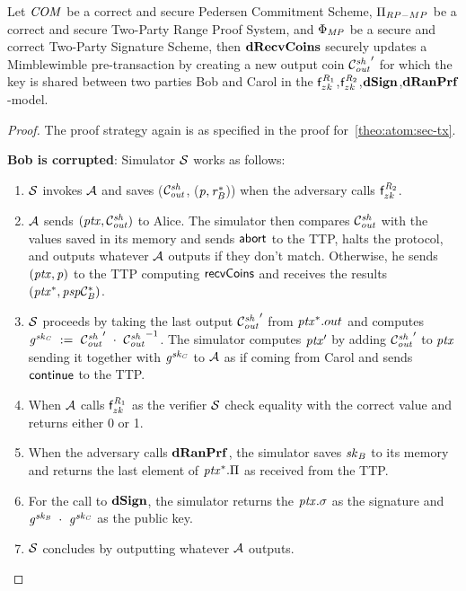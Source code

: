 \begin{theorem}
    \label{teo:atom:sec-drecv}
    Let $\mathit{COM}$ be a correct and secure Pedersen Commitment Scheme, $\Pi_{RP-MP}$ be a correct and secure Two-Party Range Proof System, and $\Phi_{\mathit{MP}}$ be a secure and correct Two-Party Signature Scheme, then $\mathbf{dRecvCoins}$ securely updates a Mimblewimble pre-transaction by creating a new output coin ${\mathcal{C}_{\mathit{out}}^{\mathit{sh}}}'$ for which the key is shared between two parties Bob and Carol in the $\mathsf{f}^{\mathit{R}_1}_{zk}$,$\mathsf{f}^{\mathit{R}_2}_{zk}$,$\mathbf{dSign}$,$\mathbf{dRanPrf}$-model.
\end{theorem}

\begin{proof}
    The proof strategy again is as specified in the proof for~\cref{theo:atom:sec-tx}.

    \textbf{Bob is corrupted}: Simulator $\mathcal{S}$ works as follows:
    \begin{enumerate}
        \item $\mathcal{S}$ invokes $\mathcal{A}$ and saves ($\mathcal{C}_{\mathit{out}}^{\mathit{sh}}$, ($\mathit{p}, \mathit{r}_{\mathit{B}}^*$)) when the adversary calls $\mathsf{f}^{\mathit{R}_2}_{zk}$.
        \item $\mathcal{A}$ sends $(\mathit{ptx},\mathcal{C}_{\mathit{out}}^{\mathit{sh}})$ to Alice.
        The simulator then compares $\mathcal{C}_{\mathit{out}}^{\mathit{sh}}$ with the values saved in its memory and sends $\mathsf{abort}$ to the TTP, halts the protocol, and outputs whatever $\mathcal{A}$ outputs if they don't match.
        Otherwise, he sends $(\mathit{ptx}, \mathit{p})$ to the TTP computing $\mathsf{recvCoins}$ and receives the results $(\mathit{ptx}^*, \mathit{psp}\mathcal{C}_{\mathit{B}}^*)$.
        \item $\mathcal{S}$ proceeds by taking the last output ${\mathcal{C}_{\mathit{out}}^{\mathit{sh}}}'$ from $\mathit{ptx}^*.out$ and computes $\mathit{g}^{\mathit{sk}_{\mathit{C}}} ~:=~ {\mathcal{C}_{\mathit{out}}^{\mathit{sh}}}' ~\cdot~ {\mathcal{C}_{\mathit{out}}^{\mathit{sh}}}^{-1}$.
        The simulator computes ${\mathit{ptx}}'$ by adding ${\mathcal{C}_{\mathit{out}}^{\mathit{sh}}}'$ to $\mathit{ptx}$ sending it together with $\mathit{g}^{\mathit{sk}_{\mathit{C}}}$ to $\mathcal{A}$ as if coming from Carol and sends $\mathsf{continue}$ to the TTP.
        \item When $\mathcal{A}$ calls $\mathsf{f}^{\mathit{R}_1}_{zk}$ as the verifier $\mathcal{S}$ check equality with the correct value and returns either 0 or 1.
        \item When the adversary calls $\mathbf{dRanPrf}$, the simulator saves $\mathit{sk}_{\mathit{B}}$ to its memory and returns the last element of $\mathit{ptx}^*.\Pi$ as received from the TTP.
        \item For the call to $\mathbf{dSign}$, the simulator returns the $\mathit{ptx}.\sigma$ as the signature and $\mathit{g}^{\mathit{sk}_{\mathit{B}}} ~\cdot~ \mathit{g}^{\mathit{sk}_{\mathit{C}}}$ as the public key.
        \item $\mathcal{S}$ concludes by outputting whatever $\mathcal{A}$ outputs.
    \end{enumerate}


\end{proof}

